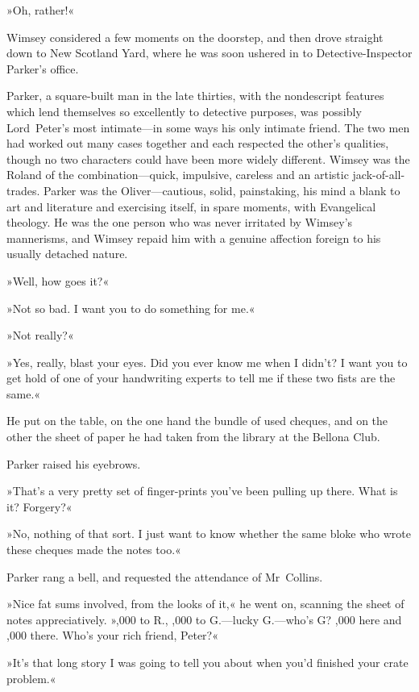 »Oh, rather!«

Wimsey considered a few moments on the doorstep, and then drove straight down to New Scotland Yard, where he was soon ushered in to Detective-Inspector Parker's office.

Parker, a square-built man in the late thirties, with the nondescript features which lend themselves so excellently to detective purposes, was possibly Lord~Peter's most intimate—in some ways his only intimate friend. The two men had worked out many cases together and each respected the other's qualities, though no two characters could have been more widely different. Wimsey was the Roland of the combination—quick, impulsive, careless and an artistic jack-of-all-trades. Parker was the Oliver—cautious, solid, painstaking, his mind a blank to art and literature and exercising itself, in spare moments, with Evangelical theology. He was the one person who was never irritated by Wimsey's mannerisms, and Wimsey repaid him with a genuine affection foreign to his usually detached nature.

»Well, how goes it?«

»Not so bad. I want you to do something for me.«

»Not really?«

»Yes, really, blast your eyes. Did you ever know me when I didn't? I want you to get hold of one of your handwriting experts to tell me if these two fists are the same.«

He put on the table, on the one hand the bundle of used cheques, and on the other the sheet of paper he had taken from the library at the Bellona Club.

Parker raised his eyebrows.

»That's a very pretty set of finger-prints you've been pulling up there. What is it? Forgery?«

»No, nothing of that sort. I just want to know whether the same bloke who wrote these cheques made the notes too.«

Parker rang a bell, and requested the attendance of Mr~Collins.

»Nice fat sums involved, from the looks of it,« he went on, scanning the sheet of notes appreciatively. »,000 to R\@., ,000 to G\@.—lucky G\@.—who's G\@? ,000 here and ,000 there. Who's your rich friend, Peter?«

»It's that long story I was going to tell you about when you'd finished your crate problem.«

